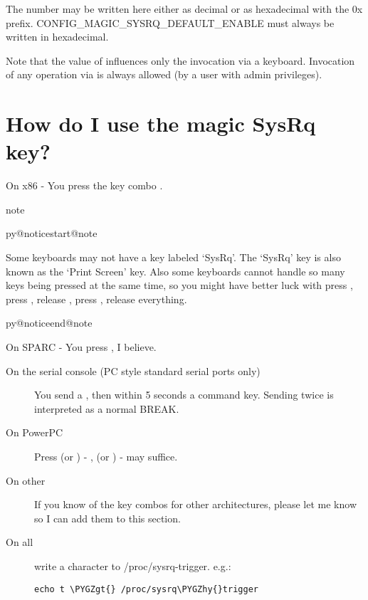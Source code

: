 \documentclass[a4paper,8pt,english]{sphinxmanual}
\makeatletter
\renewenvironment{notice}[2]{%
          \def\py@noticetype{#1}
          \begin{coloredbox}{#1}
          \bf\it
          \par\strong{#2}
          \csname py@noticestart@#1\endcsname
        }
	{
          \csname py@noticeend@\py@noticetype\endcsname
          \end{coloredbox}
        }
\def\PYGZgt{\char`\>}
\def\PYGZhy{\char`\-}
\makeatother
\begin{document}
The number may be written here either as decimal or as hexadecimal
with the 0x prefix. CONFIG\_MAGIC\_SYSRQ\_DEFAULT\_ENABLE must always be
written in hexadecimal.

Note that the value of  influences only the invocation
via a keyboard. Invocation of any operation via  is
always allowed (by a user with admin privileges).


\section{How do I use the magic SysRq key?}
\label{admin-guide/sysrq:how-do-i-use-the-magic-sysrq-key}
On x86   - You press the key combo .

\begin{notice}{note}{Note:}
Some
keyboards may not have a key labeled `SysRq'. The `SysRq' key is
also known as the `Print Screen' key. Also some keyboards cannot
handle so many keys being pressed at the same time, so you might
have better luck with press , press ,
release , press , release everything.
\end{notice}

On SPARC - You press , I believe.
\begin{description}
\item[{On the serial console (PC style standard serial ports only)}] \leavevmode
You send a , then within 5 seconds a command key. Sending
 twice is interpreted as a normal BREAK.

\item[{On PowerPC}] \leavevmode
Press  (or ) - ,
 (or ) -  may suffice.

\item[{On other}] \leavevmode
If you know of the key combos for other architectures, please
let me know so I can add them to this section.

\item[{On all}] \leavevmode
write a character to /proc/sysrq-trigger.  e.g.:

\begin{Verbatim}[commandchars=\\\{\}]
echo t \PYGZgt{} /proc/sysrq\PYGZhy{}trigger
\end{Verbatim}

\end{description}
\end{document}
